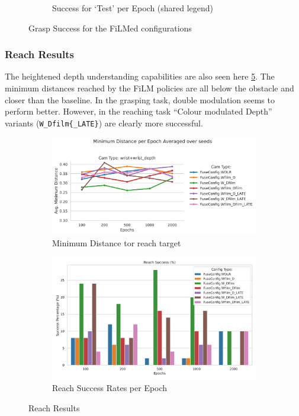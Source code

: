 \begin{figure}[H]
\begin{subfigure}{0.30\linewidth}
    \caption{Success for `Test' per Epoch (shared legend)}\label{subfig:film-grasp-control-success-epoochs}
  \end{subfigure}
  
  \caption{Grasp Success for the FiLMed configurations}\label{fig:film-grasp-success}
\end{figure}


\subsubsection{Reach Results}
The heightened depth understanding capabilities are also seen here \ref{fig:film-reach}. The minimum distances reached by the FiLM policies are all below the obstacle and closer than the baseline. In the grasping task, double modulation seems to perform better. However, in the reaching task ``Colour modulated Depth'' variants (\verb|W_Dfilm{_LATE}|) are clearly more successful.

\begin{figure}[htpb]
  \centering
  \begin{subfigure}{0.40\linewidth}
    \centering
    \includegraphics[width=\linewidth]{assets/evaluation/film/reach-min-cams.png}
    \caption{Minimum Distance tor reach target}\label{subfig:film-reach-min}
  \end{subfigure}
  \begin{subfigure}{0.40\linewidth}
    \centering
    \includegraphics[width=\linewidth]{assets/evaluation/film/base-reach-success-config-epochs.png}
    \caption{Reach Success Rates per Epoch}\label{subfig:film-reach-success}
  \end{subfigure}
  \caption{Reach Results}\label{fig:film-reach}
\end{figure}


